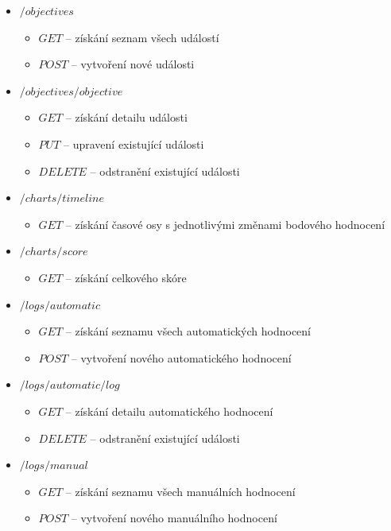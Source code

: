 \documentclass[
  digital,
  twoside,
  table, 
  nolof, 
  nolot
]{fithesis3}
\begin{document}
\begin{itemize}
    \item $/objectives$
    \begin{itemize}
        \item $GET$ -- získání seznam všech událostí
        \item $POST$ --  vytvoření nové události
    \end{itemize}
        
    \item $/objectives/{objective}$
    \begin{itemize}
        \item $GET$ -- získání detailu události
        \item $PUT$ -- upravení existující události
        \item $DELETE$ -- odstranění existující události
    \end{itemize}
        
    \item $/charts/timeline$
    \begin{itemize}
        \item $GET$ -- získání časové osy s jednotlivými změnami bodového hodnocení
    \end{itemize}
        
    \item $/charts/score$
    \begin{itemize}
        \item $GET$ -- získání celkového skóre
    \end{itemize}
        
    \item $/logs/automatic$
    \begin{itemize}
        \item $GET$ -- získání seznamu všech automatických hodnocení
        \item $POST$ --  vytvoření nového automatického hodnocení
    \end{itemize}
        
    \item $/logs/automatic/{log}$
    \begin{itemize}
        \item $GET$ -- získání detailu automatického hodnocení
        \item $DELETE$ -- odstranění existující události
    \end{itemize}
            
    \item $/logs/manual$
    \begin{itemize}
        \item $GET$ -- získání seznamu všech manuálních hodnocení
        \item $POST$ --  vytvoření nového manuálního hodnocení
    \end{itemize}
            

\end{itemize}
\end{document}
